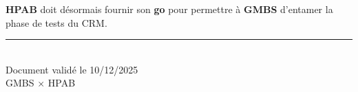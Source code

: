 \documentclass[12pt,a4paper]{article}
\begin{document}
\begin{tcolorbox}[colback=gmbs-accent!10,colframe=gmbs-accent,title={\faCheckCircle\ Prochaine étape}]
\textbf{HPAB} doit désormais fournir son \textbf{go} pour permettre à \textbf{GMBS} d'entamer la phase de tests du CRM.
\end{tcolorbox}

\vspace{2cm}

\begin{center}
\rule{0.5\textwidth}{0.5pt}\\[0.5cm]
{\large\color{gmbs-gray} Document validé le 10/12/2025}\\
{\small\color{gmbs-gray} GMBS $\times$ HPAB}
\end{center}
\end{document}
